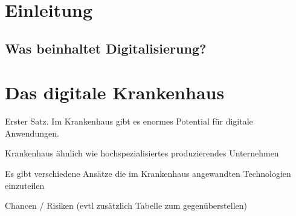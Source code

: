 
{}
\section{Einleitung}
	\subsection{Was beinhaltet Digitalisierung?}
	\parencite[11]{braeutigam2017}
\section{Das digitale Krankenhaus}
	Erster Satz. Im Krankenhaus gibt es enormes Potential für digitale Anwendungen. 

	Krankenhaus ähnlich wie hochspezialisiertes produzierendes Unternehmen

	Es gibt verschiedene Ansätze die im Krankenhaus angewandten Technologien einzuteilen

	Chancen / Risiken (evtl zusätzlich Tabelle zum gegenüberstellen)
